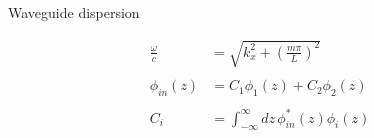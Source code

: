 \begin{frame}{Waveguide dispersion}
  \begin{minipage}{0.5\textwidth}
    \begin{align*}
      \frac{\omega}{c} &= \sqrt{k_{x}^2+\left(\frac{m\pi}{L}\right)^2}\\\\
      \phi_{in}(z) &= C_1\phi_1(z) + C_2\phi_2(z)\\\\
      C_i &= \int_{-\infty}^{\infty}dz\,\phi_{in}^*(z)\phi_i(z)
    \end{align*}
  \end{minipage}\hfill
  \begin{minipage}{0.5\textwidth}
    \begin{figure}
      \centering
      \resizebox{1\textwidth}{!}{
        
        }
    \end{figure}
  \end{minipage}
\end{frame}
